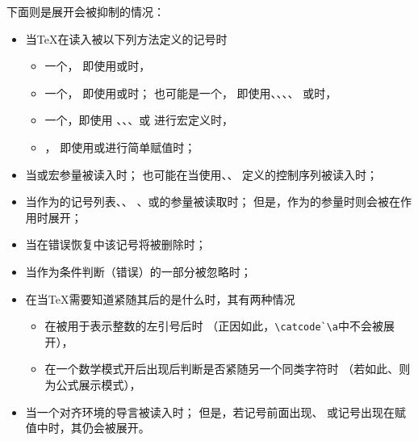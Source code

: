 \documentclass{book}
\begin{document}
下面则是展开会被抑制的情况：
\begin{itemize}\label{noexp:list}
\item 当{\TeX}在读入被以下列方法定义的记号时
    \begin{itemize} \item 一个，
           即使用或时，
        \item 一个，
           即使用或时；
           也可能是一个，
           即使用、、、、
           或时，
        \item 一个，即使用
           、、、或
           进行宏定义时，
        \item {}，
           即使用或进行简单赋值时；
    \end{itemize}
\item 当或宏参量被读入时；
      也可能在当使用、、
      定义的控制序列被读入时；
\item 当作为的记号列表、、
      、或的参量被读取时；
      但是，作为的参量时则会被在作用时展开；
\item 当在错误恢复中该记号将被删除时；
\item 当作为条件判断（错误）的一部分被忽略时；
\item 在当{\TeX}需要知道紧随其后的是什么时，其有两种情况
\begin{itemize}\item 在被用于表示整数的左引号后时
                     （正因如此，\verb-\catcode`\a-中不会被展开），
        \item 在一个数学模式开后出现后判断是否紧随另一个同类字符时
              （若如此、则为公式展示模式），\end{itemize}
\item 当一个对齐环境的导言被读入时；
      但是，若记号前面出现、
      或记号出现在赋值中时，其仍会被展开。
\end{itemize}

\end{document}
